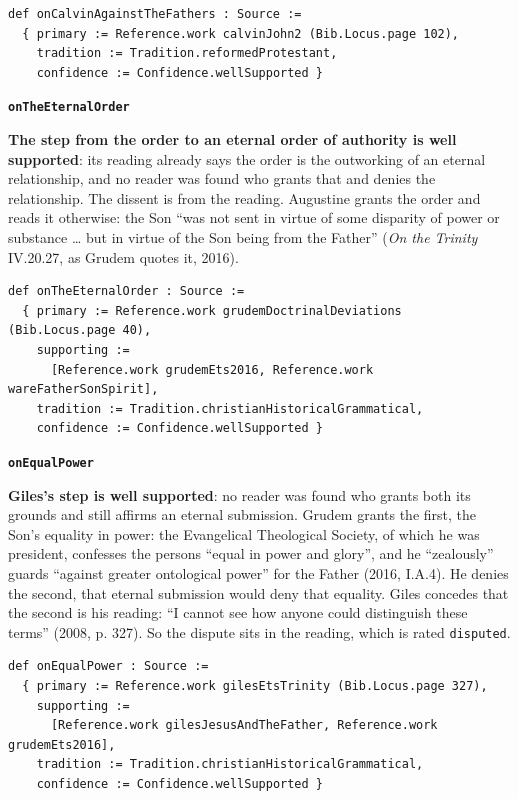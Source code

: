 \documentclass[11pt,paper=\testimonypaper,DIV=13,parskip=false]{scrartcl}
\begin{document}
{\small\begin{verbatim}
def onCalvinAgainstTheFathers : Source :=
  { primary := Reference.work calvinJohn2 (Bib.Locus.page 102),
    tradition := Tradition.reformedProtestant,
    confidence := Confidence.wellSupported }
\end{verbatim}}
\par\medskip\noindent\textbf{\texttt{on\allowbreak{}The\allowbreak{}Eternal\allowbreak{}Order}}\par\nobreak\noindent
\textbf{The step from the order to an eternal order of authority is well supported}: its reading already says the order is the outworking of an eternal relationship, and no reader was found who grants that and denies the relationship. The dissent is from the reading. Augustine grants the order and reads it otherwise: the Son “was not sent in virtue of some disparity of power or substance … but in virtue of the Son being from the Father” (\emph{On the Trinity} IV.20.27, as Grudem quotes it, 2016).

{\small\begin{verbatim}
def onTheEternalOrder : Source :=
  { primary := Reference.work grudemDoctrinalDeviations (Bib.Locus.page 40),
    supporting :=
      [Reference.work grudemEts2016, Reference.work wareFatherSonSpirit],
    tradition := Tradition.christianHistoricalGrammatical,
    confidence := Confidence.wellSupported }
\end{verbatim}}
\par\medskip\noindent\textbf{\texttt{on\allowbreak{}Equal\allowbreak{}Power}}\par\nobreak\noindent
\textbf{Giles’s step is well supported}: no reader was found who grants both its grounds and still affirms an eternal submission. Grudem grants the first, the Son’s equality in power: the Evangelical Theological Society, of which he was president, confesses the persons “equal in power and glory”, and he “zealously” guards “against greater ontological power” for the Father (2016, I.A.4). He denies the second, that eternal submission would deny that equality. Giles concedes that the second is his reading: “I cannot see how anyone could distinguish these terms” (2008, p. 327). So the dispute sits in the reading, which is rated \texttt{disputed}.

{\small\begin{verbatim}
def onEqualPower : Source :=
  { primary := Reference.work gilesEtsTrinity (Bib.Locus.page 327),
    supporting :=
      [Reference.work gilesJesusAndTheFather, Reference.work grudemEts2016],
    tradition := Tradition.christianHistoricalGrammatical,
    confidence := Confidence.wellSupported }
\end{verbatim}}
\end{document}
